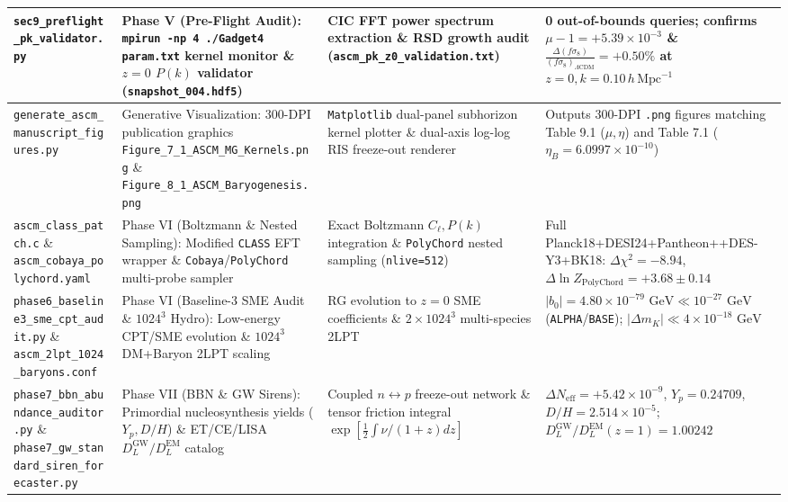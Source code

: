 \documentclass[aps,prd,onecolumn,superscriptaddress,nofootinbib,longbibliography,10pt]{revtex4-2}
\begin{document}
\begin{center}
\begin{tabular}{|llll|}
  \texttt{sec9_preflight_pk_validator.py} & Phase V (Pre-Flight Audit): \texttt{mpirun -np 4 ./Gadget4 param.txt} kernel monitor \& \(z=0\) \(P(k)\) validator (\texttt{snapshot_004.hdf5}) & CIC FFT power spectrum extraction \& RSD growth audit (\texttt{ascm_pk_z0_validation.txt}) & 0 out-of-bounds queries; confirms \(\mu - 1 = +5.39 \times 10^{-3}\) \& \(\frac{\Delta(f\sigma_8)}{(f\sigma_8)_{\Lambda\mathrm{CDM}}} = +0.50\%\) at \(z=0, k=0.10\,h\,\mathrm{Mpc}^{-1}\)
 \\ \hline


  \texttt{generate_ascm_manuscript_figures.py} & Generative Visualization: 300-DPI publication graphics \texttt{Figure_7_1_ASCM_MG_Kernels.png} \& \texttt{Figure_8_1_ASCM_Baryogenesis.png} & \texttt{Matplotlib} dual-panel subhorizon kernel plotter \& dual-axis log-log RIS freeze-out renderer & Outputs 300-DPI \texttt{.png} figures matching Table 9.1 (\(\mu, \eta\)) and Table 7.1 (\(\eta_B = 6.0997 \times 10^{-10}\))
 \\ \hline


  \texttt{ascm_class_patch.c} \& \texttt{ascm_cobaya_polychord.yaml} & Phase VI (Boltzmann \& Nested Sampling): Modified \texttt{CLASS} EFT wrapper \& \texttt{Cobaya}/\texttt{PolyChord} multi-probe sampler & Exact Boltzmann \(C_\ell, P(k)\) integration \& \texttt{PolyChord} nested sampling (\texttt{nlive=512}) & Full Planck18+DESI24+Pantheon++DES-Y3+BK18: \(\Delta\chi^2 = -8.94\), \(\Delta\ln Z_{\text{PolyChord}} = +3.68 \pm 0.14\)
 \\ \hline


  \texttt{phase6_baseline3_sme_cpt_audit.py} \& \texttt{ascm_2lpt_1024_baryons.conf} & Phase VI (Baseline-3 SME Audit \& \(1024^3\) Hydro): Low-energy CPT/SME evolution \& \(1024^3\) DM+Baryon 2LPT scaling & RG evolution to \(z=0\) SME coefficients \& \(2\times 1024^3\) multi-species 2LPT & \(|b_0| = 4.80 \times 10^{-79}\text{ GeV} \ll 10^{-27}\text{ GeV}\) (\texttt{ALPHA}/\texttt{BASE}); \(|\Delta m_K| \ll 4 \times 10^{-18}\text{ GeV}\)
 \\ \hline


  \texttt{phase7_bbn_abundance_auditor.py} \& \texttt{phase7_gw_standard_siren_forecaster.py} & Phase VII (BBN \& GW Sirens): Primordial nucleosynthesis yields (\(Y_p, D/H\)) \& ET/CE/LISA \(D_L^{\mathrm{GW}}/D_L^{\mathrm{EM}}\) catalog & Coupled \(n \leftrightarrow p\) freeze-out network \& tensor friction integral \(\exp[\frac{1}{2}\int \nu/(1+z)dz]\) & \(\Delta N_{\mathrm{eff}} = +5.42 \times 10^{-9}\), \(Y_p = 0.24709\), \(D/H = 2.514 \times 10^{-5}\); \(D_L^{\mathrm{GW}}/D_L^{\mathrm{EM}}(z=1) = 1.00242\)
 \\ \hline



\end{tabular}
\end{center}
\end{document}
